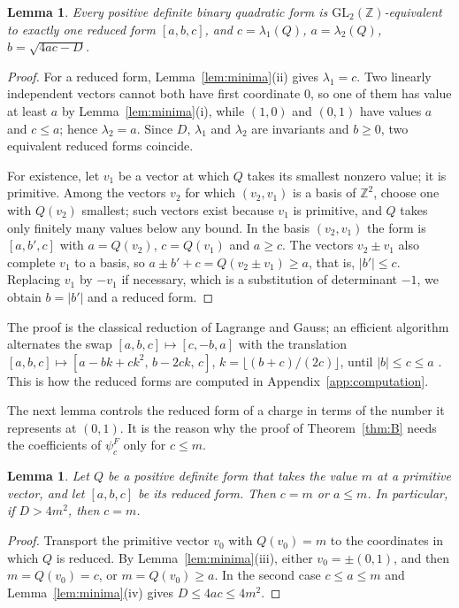 \documentclass[11pt]{amsart}
\newtheorem{lemma}[theorem]{Lemma}
\theoremstyle{definition}
\newcommand{\ZZ}{\mathbb{Z}}
\begin{document}
\begin{lemma}\label{lem:reduced}
Every positive definite binary quadratic form is $\mathrm{GL}_2(\ZZ)$-equivalent to exactly one reduced form $[a,b,c]$, and $c=\lambda_1(Q)$, $a=\lambda_2(Q)$, $b=\sqrt{4ac-D}$.
\end{lemma}

\begin{proof}
For a reduced form, Lemma~\ref{lem:minima}(ii) gives $\lambda_1=c$. Two linearly independent vectors cannot both have first coordinate $0$, so one of them has value at least $a$ by Lemma~\ref{lem:minima}(i), while $(1,0)$ and $(0,1)$ have values $a$ and $c\le a$; hence $\lambda_2=a$. Since $D$, $\lambda_1$ and $\lambda_2$ are invariants and $b\ge0$, two equivalent reduced forms coincide.

For existence, let $v_1$ be a vector at which $Q$ takes its smallest nonzero value; it is primitive. Among the vectors $v_2$ for which $(v_2,v_1)$ is a basis of $\ZZ^2$, choose one with $Q(v_2)$ smallest; such vectors exist because $v_1$ is primitive, and $Q$ takes only finitely many values below any bound. In the basis $(v_2,v_1)$ the form is $[a,b',c]$ with $a=Q(v_2)$, $c=Q(v_1)$ and $a\ge c$. The vectors $v_2\pm v_1$ also complete $v_1$ to a basis, so $a\pm b'+c=Q(v_2\pm v_1)\ge a$, that is, $|b'|\le c$. Replacing $v_1$ by $-v_1$ if necessary, which is a substitution of determinant $-1$, we obtain $b=|b'|$ and a reduced form.
\end{proof}

The proof is the classical reduction of Lagrange and Gauss; an efficient algorithm alternates the swap $[a,b,c]\mapsto[c,-b,a]$ with the translation $[a,b,c]\mapsto[a-bk+ck^2,\,b-2ck,\,c]$, $k=\lfloor(b+c)/(2c)\rfloor$, until $|b|\le c\le a$ \cite[\S2.2]{Bue89}. This is how the reduced forms are computed in Appendix~\ref{app:computation}.

The next lemma controls the reduced form of a charge in terms of the number it represents at $(0,1)$. It is the reason why the proof of Theorem~\ref{thm:B} needs the coefficients of $\psi^F_c$ only for $c\le m$.

\begin{lemma}\label{lem:secondcharge}
Let $Q$ be a positive definite form that takes the value $m$ at a primitive vector, and let $[a,b,c]$ be its reduced form. Then $c=m$ or $a\le m$. In particular, if $D>4m^2$, then $c=m$.
\end{lemma}

\begin{proof}
Transport the primitive vector $v_0$ with $Q(v_0)=m$ to the coordinates in which $Q$ is reduced. By Lemma~\ref{lem:minima}(iii), either $v_0=\pm(0,1)$, and then $m=Q(v_0)=c$, or $m=Q(v_0)\ge a$. In the second case $c\le a\le m$ and Lemma~\ref{lem:minima}(iv) gives $D\le4ac\le4m^2$.
\end{proof}
\end{document}
